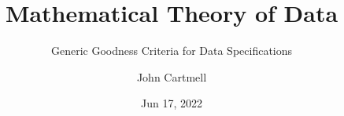 
\usepackage{mathptmx}
\usepackage{amsfonts}
\usepackage{wasysym}
\usepackage{url}
\usepackage{hyperref}

\newcommand{\sharedmacros}{../../SharedMacros}










\renewcommand{\erpictureFolder}[0]{../../SharedPictures}
\setcounter{equation}{0}





\title[John Cartmell]{Mathematical Theory of Data}
\subtitle{Generic Goodness Criteria for Data Specifications}
\author{John Cartmell}
\date{Jun 17, 2022}

\usepackage{framed}
\usepackage{bibentry}
\usepackage{colortbl}
\usepackage{ulem}   %
\usepackage{listings}
\usepackage{arydshln} %
\usepackage{pst-arrow} %




\newcommand{\slidecontext}{Introduction} %

\newcommand{\comingnext}[1]{
\begin{frame}{COMING NEXT}
\begin{center}
\Large #1
\end{center}
\end{frame}
}




\begin{frame}
\titlepage
{}
\end{frame}

